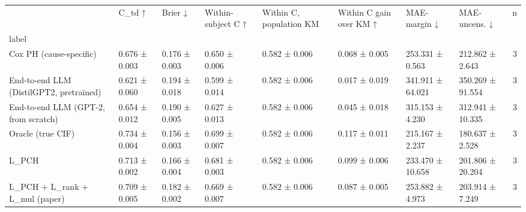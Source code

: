 \begin{tabular}{llllllllr}
\toprule
 & C\_td ↑ & Brier ↓ & Within-subject C ↑ & Within C, population KM & Within C gain over KM ↑ & MAE-margin ↓ & MAE-uncens. ↓ & n \\
label &  &  &  &  &  &  &  &  \\
\midrule
Cox PH (cause-specific) & 0.676 ± 0.003 & 0.176 ± 0.003 & 0.650 ± 0.006 & 0.582 ± 0.006 & 0.068 ± 0.005 & 253.331 ± 0.563 & 212.862 ± 2.643 & 3 \\
End-to-end LLM (DistilGPT2, pretrained) & 0.621 ± 0.060 & 0.194 ± 0.018 & 0.599 ± 0.014 & 0.582 ± 0.006 & 0.017 ± 0.019 & 341.911 ± 64.021 & 350.269 ± 91.554 & 3 \\
End-to-end LLM (GPT-2, from scratch) & 0.654 ± 0.012 & 0.190 ± 0.005 & 0.627 ± 0.013 & 0.582 ± 0.006 & 0.045 ± 0.018 & 315.153 ± 4.230 & 312.941 ± 10.335 & 3 \\
Oracle (true CIF) & 0.734 ± 0.004 & 0.156 ± 0.003 & 0.699 ± 0.007 & 0.582 ± 0.006 & 0.117 ± 0.011 & 215.167 ± 2.237 & 180.637 ± 2.528 & 3 \\
L\_PCH & 0.713 ± 0.002 & 0.166 ± 0.004 & 0.681 ± 0.003 & 0.582 ± 0.006 & 0.099 ± 0.006 & 233.470 ± 10.658 & 201.806 ± 20.204 & 3 \\
L\_PCH + L\_rank + L\_mul (paper) & 0.709 ± 0.005 & 0.182 ± 0.002 & 0.669 ± 0.007 & 0.582 ± 0.006 & 0.087 ± 0.005 & 253.882 ± 4.973 & 203.914 ± 7.249 & 3 \\
\bottomrule
\end{tabular}
